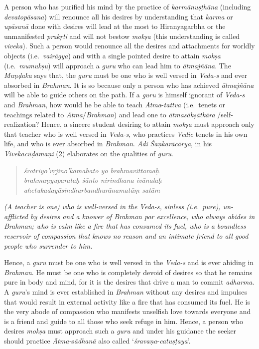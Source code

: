 A person who has purified his mind by the practice of \emph{karmānu\-ṣṭhāna} (including \emph{devatopāsana}) will renounce all his desires by understanding that \emph{karma} or \emph{upāsanā} done with desires will lead at the most to Hiranyagarbha or the unmanifested \emph{prakṛti} and will not bestow \emph{mokṣa} (this understanding is called \emph{viveka}). Such a person would renounce all the desires and attachments for worldly objects (i.e.\ \emph{vairāgya}) and with a single pointed desire to attain \emph{mokṣa} (i.e.\ \emph{mumukṣu}) will approach a \emph{guru} who can lead him to \emph{ātmajñāna}. The \emph{Muṇḍaka} says that, the \emph{guru} must be one who is well versed in \emph{Veda-s} and ever absorbed in \emph{Brahman}. It is so because only a person who has achieved \emph{ātmajñāna} will be able to guide others on the path. If a \emph{guru} is himself ignorant of \emph{Veda-s} and \emph{Brahman}, how would he be able to teach \emph{Ātma}-\emph{tattva} (i.e.\ tenets or teachings related to \emph{Ātma}/\emph{Brahman}) and lead one to \emph{ātmasākṣātkāra} /self-realization? Hence, a sincere student desiring to attain \emph{mokṣa} must approach only that teacher who is well versed in \emph{Veda-s}, who practices \emph{Vedic} tenets in his own life, and who is ever absorbed in \emph{Brahman}. \emph{Ādi} \emph{Śaṇkarācārya}, in his \emph{Vivekacūḍāmaṇi} (2) elaborates on the qualities of \emph{guru}.

\begin{verse}
\emph{śrotriyo'vṛjino'kāmahato yo brahmavittamaḥ }\\
\emph{brahmaṇyuparataḥ śānto nirindhana ivānalaḥ }\\
\emph{ahetukadayāsindhurbandhurānamatāṃ satām }
\end{verse}

\emph{(A teacher is one) who is well-versed in the Veda-s, sinless (i.e.\ pure), un-afflicted by desires and a knower of Brahman par excellence, who always abides in Brahman; who is calm like a fire that has consumed its fuel, who is a boundless reservoir of compassion that knows no reason and an intimate friend to all good people who surrender to him.}

Hence, a \emph{guru} must be one who is well versed in the \emph{Veda-s} and is ever abiding in \emph{Brahman}. He must be one who is completely devoid of desires so that he remains pure in body and mind, for it is the desires that drive a man to commit \emph{adharma}. A \emph{guru}'s mind is ever established in \emph{Brahman} without any desires and impulses that would result in external activity like a fire that has consumed its fuel. He is the very abode of compassion who manifests unselfish love towards everyone and is a friend and guide to all those who seek refuge in him. Hence, a person who desires \emph{mokṣa} must approach such a \emph{guru} and under his guidance the seeker should practice \emph{Ātma-}s\emph{ādhanā} also called `\emph{śravaṇa}-\emph{catuṣṭaya}'.

